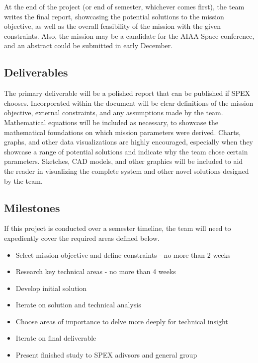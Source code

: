 \documentclass[conference]{IEEEtran} %
\begin{document}
At the end of the project (or end of semester, whichever comes first), the team writes the final report, showcasing the potential solutions to the mission objective, as well as the overall feasibility of the mission with the given constraints.
Also, the mission may be a candidate for the AIAA Space conference, and an abstract could be submitted in early December.

\subsection{Deliverables}
\label{subsec:deliverables}
The primary deliverable will be a polished report that can be published if SPEX chooses.
Incorporated within the document will be clear definitions of the mission objective, external constraints, and any assumptions made by the team.
Mathematical equations will be included as necessary, to showcase the mathematical foundations on which mission parameters were derived.
Charts, graphs, and other data visualizations are highly encouraged, especially when they showcase a range of potential solutions and indicate why the team chose certain parameters.
Sketches, CAD models, and other graphics will be included to aid the reader in visualizing the complete system and other novel solutions designed by the team.
\subsection{Milestones}
\label{subsec:milestones}
If this project is conducted over a semester timeline, the team will need to expediently cover the required areas defined below.
\begin{itemize}
  \item Select mission objective and define constraints - no more than 2 weeks
  \item Research key technical areas - no more than 4 weeks
  \item Develop initial solution
  \item Iterate on solution and technical analysis
  \item Choose areas of importance to delve more deeply for technical insight
  \item Iterate on final deliverable
  \item Present finished study to SPEX adivsors and general group
\end{itemize}
\end{document}
